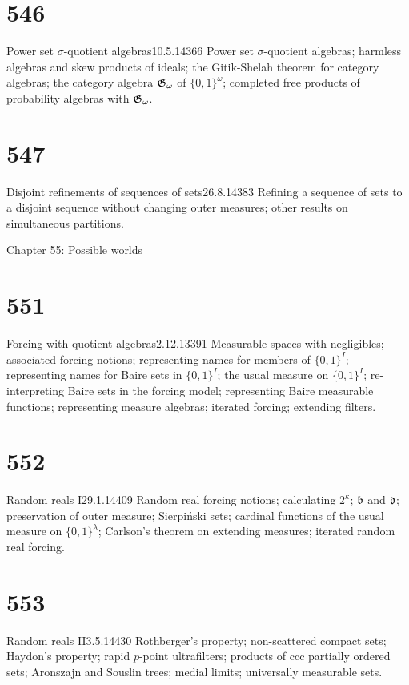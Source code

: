 \section{546}{Power set $\sigma$-quotient algebras}{10.5.14}{}{366}
{Power set $\sigma$-quotient algebras;  harmless algebras and
skew products of ideals;  the Gitik-Shelah theorem for
category algebras;  the category algebra $\frak{G}_{\omega}$
of $\{0,1\}^{\omega}$;  completed free products of probability algebras 
with $\frak{G}_{\omega}$.}

\section{547}{Disjoint refinements of sequences of sets}{26.8.14}{}{383}
{Refining a sequence of sets to a disjoint sequence without changing outer
measures;  other results on simultaneous partitions.}


Chapter 55:  Possible worlds


\section{551}{Forcing with quotient algebras}{2.12.13}{}{391}
{Measurable spaces with negligibles;  associated forcing notions;  
representing names for members of $\{0,1\}^I$;  representing names for
Baire sets in $\{0,1\}^I$;  the usual measure on $\{0,1\}^I$;  
re-interpreting Baire sets in the forcing model;  representing Baire
measurable functions;  representing measure algebras;  iterated forcing;
extending filters.}

\section{552}{Random reals I}{29.1.14}{}{409}
{Random real forcing notions;  calculating $2^{\kappa}$;  $\frak{b}$ and
$\frak{d}$;  preservation of outer measure;  Sierpi\'nski sets;  
cardinal functions of the usual measure on $\{0,1\}^{\lambda}$;  
Carlson's theorem on extending measures;  iterated random real forcing.}

\section{553}{Random reals II}{3.5.14}{}{430}
{Rothberger's property;  non-scattered compact sets;  Haydon's property;
rapid $p$-point ultrafilters;  products of ccc partially ordered sets;  
Aronszajn and Souslin
trees;  medial limits;  universally measurable sets.}

